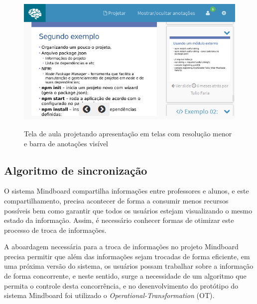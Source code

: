 \begin{figure}[h]
\centering
\caption{Tela de aula projetando apresentação em telas com resolução menor e barra de anotações visível}
\includegraphics[width=1.0\textwidth]{imgs/tela_aula_slide_mob_anotacoes.png} 
\label{fig:tela_aula_mob_anot} 
\end{figure}





\subsection{Algoritmo de sincronização}
\label{sec:alg_ot}

O sistema Mindboard compartilha informações entre professores e alunos, e este compartilhamento, precisa acontecer de forma a consumir menos recursos possíveis bem como garantir que todos os usuários estejam visualizando o mesmo estado da informação. Assim, é necessário conhecer formas de otimizar este processo de troca de informações.

A aboardagem necessária para a troca de informações no projeto Mindboard precisa permitir que além das informações sejam trocadas de forma eficiente, em uma próxima versão do sistema, os usuários possam trabalhar sobre a informação de forma concorrente, e neste sentido, surge a necessidade de um algoritmo que permita o controle desta concorrência, e no desenvolvimento do protótipo do sistema Mindboard foi utilizado o \emph{Operational-Transformation} (OT).

